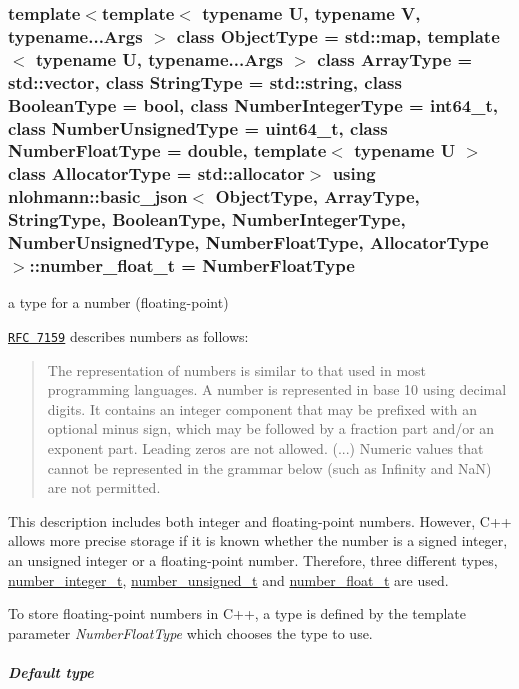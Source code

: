 \subsubsection[{\texorpdfstring{number\+\_\+float\+\_\+t}{number\_float\_t}}]{\setlength{\rightskip}{0pt plus 5cm}template$<$template$<$ typename U, typename V, typename...\+Args $>$ class Object\+Type = std\+::map, template$<$ typename U, typename...\+Args $>$ class Array\+Type = std\+::vector, class String\+Type  = std\+::string, class Boolean\+Type  = bool, class Number\+Integer\+Type  = int64\+\_\+t, class Number\+Unsigned\+Type  = uint64\+\_\+t, class Number\+Float\+Type  = double, template$<$ typename U $>$ class Allocator\+Type = std\+::allocator$>$ using {\bf nlohmann\+::basic\+\_\+json}$<$ Object\+Type, Array\+Type, String\+Type, Boolean\+Type, Number\+Integer\+Type, Number\+Unsigned\+Type, Number\+Float\+Type, Allocator\+Type $>$\+::{\bf number\+\_\+float\+\_\+t} =  Number\+Float\+Type}\hypertarget{a00025_a74a0013e847fdc574b48f931f0e757e1}{}\label{a00025_a74a0013e847fdc574b48f931f0e757e1}


a type for a number (floating-\/point) 

\href{http://rfc7159.net/rfc7159}{\tt R\+FC 7159} describes numbers as follows\+: \begin{quote}
The representation of numbers is similar to that used in most programming languages. A number is represented in base 10 using decimal digits. It contains an integer component that may be prefixed with an optional minus sign, which may be followed by a fraction part and/or an exponent part. Leading zeros are not allowed. (...) Numeric values that cannot be represented in the grammar below (such as Infinity and NaN) are not permitted. \end{quote}


This description includes both integer and floating-\/point numbers. However, C++ allows more precise storage if it is known whether the number is a signed integer, an unsigned integer or a floating-\/point number. Therefore, three different types, \hyperlink{a00025_ac4b10b2364f26ce47bdb9a413ff04a59}{number\+\_\+integer\+\_\+t}, \hyperlink{a00025_a60a04166c122072ab11eaf9845d9cd1d}{number\+\_\+unsigned\+\_\+t} and \hyperlink{a00025_a74a0013e847fdc574b48f931f0e757e1}{number\+\_\+float\+\_\+t} are used.

To store floating-\/point numbers in C++, a type is defined by the template parameter {\itshape Number\+Float\+Type} which chooses the type to use.

\subparagraph*{Default type}

